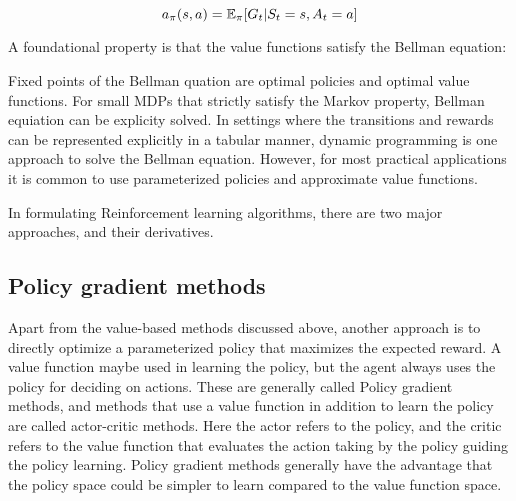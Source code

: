 $$ a_{\pi}(s, a) =
	\mathbb{E}_{\pi}[G_t | S_t = s, A_t = a] $$

A foundational property is that the value
functions satisfy the Bellman equation:


Fixed points of the Bellman quation are optimal policies and optimal value functions.
For small MDPs that strictly satisfy the Markov property, Bellman equiation can be explicity
solved.
In settings where the transitions and rewards can be represented explicitly in a tabular manner,
dynamic programming is one approach to solve the Bellman equation.
However, for most practical applications it is common to use parameterized policies and approximate
value functions.

In formulating Reinforcement learning algorithms, there are two major approaches, and their
derivatives.



\label{sec:spg} \subsection{Policy gradient
	methods}\label{sec:pg}

Apart from the value-based methods discussed above, another approach is to directly optimize a
parameterized policy that maximizes the expected reward.
A value function maybe used in learning the policy, but the agent always uses the policy for
deciding on actions.
These are generally called Policy gradient methods, and methods that use a value function in
addition to learn the policy are called actor-critic methods.
Here the actor refers to the policy, and the critic refers to the value function that evaluates the
action taking by the policy guiding the policy learning.
Policy gradient methods generally have the advantage that the policy space could be simpler to
learn compared to the value function space.

